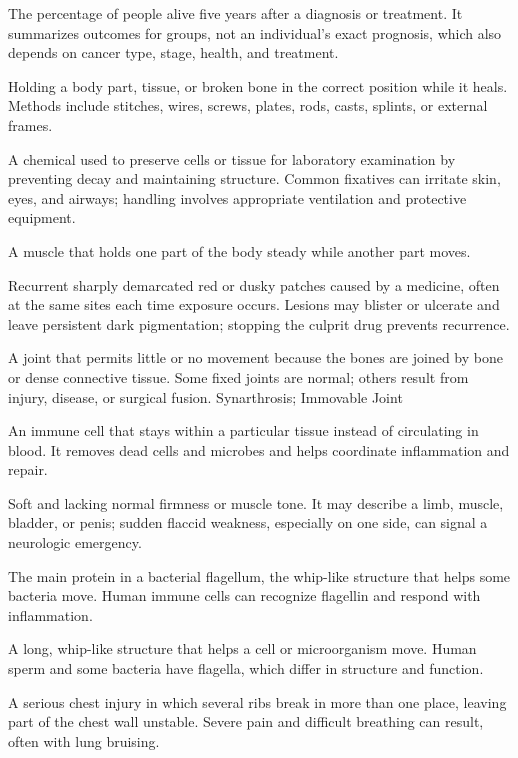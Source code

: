  The percentage of people alive five years after a diagnosis or treatment. It summarizes outcomes for groups, not an individual’s exact prognosis, which also depends on cancer type, stage, health, and treatment.

 Holding a body part, tissue, or broken bone in the correct position while it heals. Methods include stitches, wires, screws, plates, rods, casts, splints, or external frames.

 A chemical used to preserve cells or tissue for laboratory examination by preventing decay and maintaining structure. Common fixatives can irritate skin, eyes, and airways; handling involves appropriate ventilation and protective equipment.

 A muscle that holds one part of the body steady while another part moves.

 Recurrent sharply demarcated red or dusky patches caused by a medicine, often at the same sites each time exposure occurs. Lesions may blister or ulcerate and leave persistent dark pigmentation; stopping the culprit drug prevents recurrence.

 A joint that permits little or no movement because the bones are joined by bone or dense connective tissue. Some fixed joints are normal; others result from injury, disease, or surgical fusion.
\synonyms
Synarthrosis; Immovable Joint

 An immune cell that stays within a particular tissue instead of circulating in blood. It removes dead cells and microbes and helps coordinate inflammation and repair.

 Soft and lacking normal firmness or muscle tone. It may describe a limb, muscle, bladder, or penis; sudden flaccid weakness, especially on one side, can signal a neurologic emergency.

 The main protein in a bacterial flagellum, the whip-like structure that helps some bacteria move. Human immune cells can recognize flagellin and respond with inflammation.

 A long, whip-like structure that helps a cell or microorganism move. Human sperm and some bacteria have flagella, which differ in structure and function.

 A serious chest injury in which several ribs break in more than one place, leaving part of the chest wall unstable. Severe pain and difficult breathing can result, often with lung bruising.

